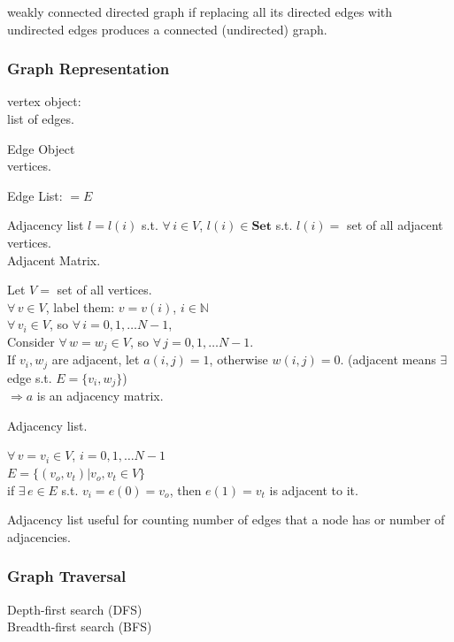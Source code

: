 \documentclass[10pt]{amsart}
\begin{document}
\begin{multicols*}{2}
weakly connected directed graph if replacing all its directed edges with undirected edges produces a connected (undirected) graph. 

\subsubsection{Graph Representation} 

vertex object: \\
list of edges. 

Edge Object \\
vertices. 

Edge List: $=E$ 

Adjacency list $l = l(i)$ s.t. $\forall \, i \in V$, $l(i) \in \textbf{Set}$ s.t. $l(i) = $ set of all adjacent vertices. \\

Adjacent Matrix. 

Let $V=$ set of all vertices. \\
$\forall \, v \in V$, label them: $v=v(i)$, $i \in \mathbb{N}$ \\

$\forall \, v_i \in V$, so $\forall \, i = 0, 1, \dots N-1$, \\
Consider $\forall \, w = w_j \in V$, so $\forall \, j = 0 , 1, \dots N-1$. \\

If $v_i, w_j$ are adjacent, let $a(i,j) = 1$, otherwise $w(i,j) =0$. (adjacent means $\exists \,$ edge s.t. $E = \lbrace v_i, w_j \rbrace$) \\
$\Longrightarrow a$ is an adjacency matrix. 

Adjacency list. 

$\forall \, v = v_i \in V$, $i=0,1,\dots N-1$ \\
$E = \lbrace (v_o, v_t) | v_o, v_t \in V \rbrace$ \\
if $\exists \, e \in E$ s.t. $v_i = e(0) = v_o$, then $e(1) = v_t$ is adjacent to it. 

Adjacency list useful for counting number of edges that a node has or number of adjacencies.

\subsubsection{Graph Traversal}  

Depth-first search (DFS) \\
Breadth-first search (BFS) \\


\end{multicols*}
\end{document}
